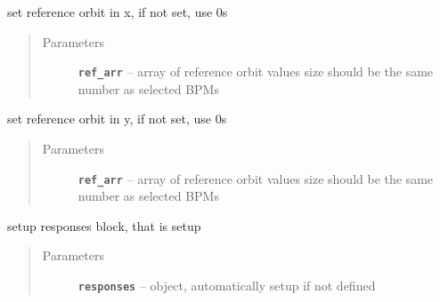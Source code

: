 \documentclass[letterpaper,10pt,english]{sphinxmanual}
\begin{document}
\begin{fulllineitems}
\begin{fulllineitems}
\begin{quote}
\begin{description}
\end{description}\end{quote}

\end{fulllineitems}


\begin{fulllineitems}
\label{src/apidocs/dakopt:genopt.dakopt.DakotaOC.set_ref_x0}
set reference orbit in x, if not set, use 0s
\begin{quote}\begin{description}
\item[{Parameters}] \leavevmode
\textbf{\texttt{ref\_arr}} -- array of reference orbit values
size should be the same number as selected BPMs

\end{description}\end{quote}

\end{fulllineitems}


\begin{fulllineitems}
\label{src/apidocs/dakopt:genopt.dakopt.DakotaOC.set_ref_y0}
set reference orbit in y, if not set, use 0s
\begin{quote}\begin{description}
\item[{Parameters}] \leavevmode
\textbf{\texttt{ref\_arr}} -- array of reference orbit values
size should be the same number as selected BPMs

\end{description}\end{quote}

\end{fulllineitems}


\begin{fulllineitems}
\label{src/apidocs/dakopt:genopt.dakopt.DakotaOC.set_responses}
setup responses block, that is setup 
\begin{quote}\begin{description}
\item[{Parameters}] \leavevmode
\textbf{\texttt{responses}} --  object, automatically setup if not defined


\end{description}
\end{quote}
\end{fulllineitems}
\end{fulllineitems}
\end{document}
